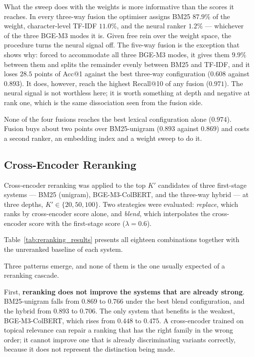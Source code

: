 \documentclass[preprint,12pt]{elsarticle}
\begin{document}
What the sweep does with the weights is more informative than the scores it reaches. In every three-way fusion the optimiser assigns BM25 $87.9\%$ of the weight, character-level TF-IDF $11.0\%$, and the neural ranker $1.2\%$ --- whichever of the three BGE-M3 modes it is. Given free rein over the weight space, the procedure turns the neural signal off. The five-way fusion is the exception that shows why: forced to accommodate all three BGE-M3 modes, it gives them $9.9\%$ between them and splits the remainder evenly between BM25 and TF-IDF, and it loses $28.5$ points of Acc@1 against the best three-way configuration ($0.608$ against $0.893$). It does, however, reach the highest Recall@10 of any fusion ($0.971$). The neural signal is not worthless here; it is worth something at depth and negative at rank one, which is the same dissociation seen from the fusion side.

None of the four fusions reaches the best lexical configuration alone ($0.974$). Fusion buys about two points over BM25-unigram ($0.893$ against $0.869$) and costs a second ranker, an embedding index and a weight sweep to do it.

\subsection{Cross-Encoder Reranking}
\label{subsec:reranking}

Cross-encoder reranking was applied to the top $K'$ candidates of three first-stage systems --- BM25 (unigram), BGE-M3-ColBERT, and the three-way hybrid --- at three depths, $K' \in \{20, 50, 100\}$. Two strategies were evaluated: \textit{replace}, which ranks by cross-encoder score alone, and \textit{blend}, which interpolates the cross-encoder score with the first-stage score ($\lambda = 0.6$).

Table~\ref{tab:reranking_results} presents all eighteen combinations together with the unreranked baseline of each system.


Three patterns emerge, and none of them is the one usually expected of a reranking cascade.

First, \textbf{reranking does not improve the systems that are already strong}. BM25-unigram falls from $0.869$ to $0.766$ under the best blend configuration, and the hybrid from $0.893$ to $0.706$. The only system that benefits is the weakest, BGE-M3-ColBERT, which rises from $0.448$ to $0.475$. A cross-encoder trained on topical relevance can repair a ranking that has the right family in the wrong order; it cannot improve one that is already discriminating variants correctly, because it does not represent the distinction being made.
\end{document}
